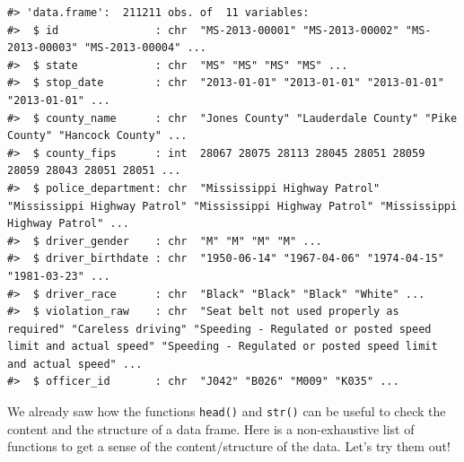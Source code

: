 \documentclass[
]{book}
\begin{document}
\begin{verbatim}
#> 'data.frame':  211211 obs. of  11 variables:
#>  $ id               : chr  "MS-2013-00001" "MS-2013-00002" "MS-2013-00003" "MS-2013-00004" ...
#>  $ state            : chr  "MS" "MS" "MS" "MS" ...
#>  $ stop_date        : chr  "2013-01-01" "2013-01-01" "2013-01-01" "2013-01-01" ...
#>  $ county_name      : chr  "Jones County" "Lauderdale County" "Pike County" "Hancock County" ...
#>  $ county_fips      : int  28067 28075 28113 28045 28051 28059 28059 28043 28051 28051 ...
#>  $ police_department: chr  "Mississippi Highway Patrol" "Mississippi Highway Patrol" "Mississippi Highway Patrol" "Mississippi Highway Patrol" ...
#>  $ driver_gender    : chr  "M" "M" "M" "M" ...
#>  $ driver_birthdate : chr  "1950-06-14" "1967-04-06" "1974-04-15" "1981-03-23" ...
#>  $ driver_race      : chr  "Black" "Black" "Black" "White" ...
#>  $ violation_raw    : chr  "Seat belt not used properly as required" "Careless driving" "Speeding - Regulated or posted speed limit and actual speed" "Speeding - Regulated or posted speed limit and actual speed" ...
#>  $ officer_id       : chr  "J042" "B026" "M009" "K035" ...
\end{verbatim}

We already saw how the functions \texttt{head()} and \texttt{str()} can be useful to check the
content and the structure of a data frame. Here is a non-exhaustive list of
functions to get a sense of the content/structure of the data. Let's try them out!
\end{document}
